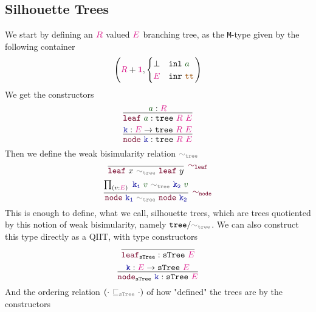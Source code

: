 \documentclass[twoside,11pt,openright]{report}
\theoremstyle{plain} %
\theoremstyle{definition}
\theoremstyle{remark}
\newcommand*{\term}[1]{\textcolor{green!30!black}{#1}} %
\newcommand*{\type}[1]{\textcolor{magenta!90!black}{#1}}
\newcommand*{\unit}{\type{\textbf{1}}}
\newcommand*{\relation}[1]{\textcolor{gray}{\ensuremath{\mathtt{#1}}}}
\newcommand*{\constant}[1]{\textcolor{orange!60!black}{\ensuremath{\mathtt{#1}}}}
\newcommand*{\function}[1]{\textcolor{blue!60!black}{\ensuremath{\mathtt{#1}}}}
\newcommand*{\constructor}[1]{\textcolor{purple!60!black}{\ensuremath{\mathtt{#1}}}}
\newcommand*{\typeformer}[1]{\ensuremath{\mathtt{#1}}}
\begin{document}
\subsection{Silhouette Trees}
We start by defining an \(\type{R}\) valued \(\type{E}\) branching tree, as the \texttt{M}-type given by the following container
\begin{equation}
  \left(\type{R} + \unit , \begin{cases} \bot & \mathtt{inl}~\term{a} \\ \type{E} & \mathtt{inr}~\constant{tt} \end{cases}\right)
\end{equation}
We get the constructors
\begin{equation}
  \infer{\constructor{leaf}~\term{a} : \typeformer{tree}~\type{R}~\type{E}}{\term{a} : \type{R}}
\end{equation}
\begin{equation}
  \infer{\constructor{node}~\function{k} : \typeformer{tree}~\type{R}~\type{E}}{\function{k} : \type{E} \rightarrow \typeformer{tree}~\type{R}~\type{E}}
\end{equation}
Then we define the weak bisimularity relation \(\relation{\sim_{tree}}\)
\begin{equation}
  \infer[\constructor{\sim_{leaf}}]{\constructor{leaf}~x~\relation{\sim_{tree}}~\constructor{leaf}~y}{}
\end{equation}
\begin{equation}
  \infer[\constructor{\sim_{node}}]{\constructor{node}~\function{k_1}~\relation{\sim_{tree}}~\constructor{node}~\function{k_2}}{\prod_{(v : \type{E})}~\function{k_1}~\term{v}~\relation{\sim_{tree}}~\function{k_2}~\term{v}}
\end{equation}
This is enough to define, what we call, silhouette trees, which are trees quotiented by this notion of weak bisimularity, namely \(\typeformer{tree} / \relation{\sim_{tree}}\). We can also construct this type directly as a QIIT, with type constructors 
\begin{equation}
  \infer{\constructor{leaf}_{\typeformer{sTree}} : \typeformer{sTree}~\type{E}}{}
\end{equation}
\begin{equation}
  \infer{\constructor{node}_{\typeformer{sTree}}~\function{k} : \typeformer{sTree}~\type{E}}{\function{k} : \type{E} \rightarrow \typeformer{sTree}~\type{E}}
\end{equation}
And the ordering relation \((\cdot~\relation{\sqsubseteq_{sTree}}~\cdot)\) of how "defined" the trees are by the constructors 
\end{document}
